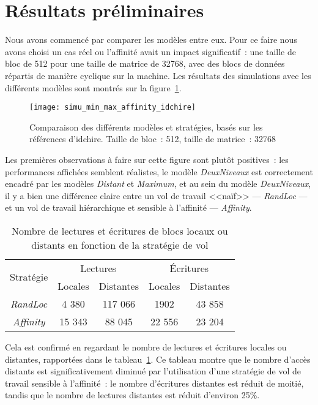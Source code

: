 \section{Résultats préliminaires}\label{sec:simulation:resultats}


Nous avons commencé par comparer les modèles entre eux.
Pour ce faire nous avons choisi un cas réel ou l'affinité avait un impact significatif~: une taille de bloc de 512 pour une taille de matrice de 32768, avec des blocs de données répartis de manière cyclique sur la machine.
Les résultats des simulations avec les différents modèles sont montrés sur la figure~\ref{fig:simu:modeles:idchire}.

\begin{figure}[h!]
  \centering
  \texttt{[image: simu\_min\_max\_affinity\_idchire]}
  \caption{Comparaison des différents modèles et stratégies, basés sur les références d'idchire. Taille de bloc~: 512, taille de matrice~: 32768}\label{fig:simu:modeles:idchire}
\end{figure}


Les premières observations à faire sur cette figure sont plutôt positives~: les performances affichées semblent réalistes, le modèle \emph{DeuxNiveaux} est correctement encadré par les modèles \emph{Distant} et \emph{Maximum}, et au sein du modèle \emph{DeuxNiveaux}, il y a bien une différence claire entre un vol de travail <<naïf>> --- \emph{RandLoc} --- et un vol de travail hiérarchique et sensible à l'affinité --- \emph{Affinity}.

\begin{table}[h!]
\def\arraystretch{1.5}
\centering
\begin{tabular}{|c||c|c|c|c|}\hline
  \multirow{2}{*}{Stratégie} & \multicolumn{2}{c|}{Lectures} & \multicolumn{2}{c|}{Écritures} \\ \cline{2-5}
    & Locales & Distantes & Locales & Distantes \\
  \hline
  \emph{RandLoc} & 4 380 & 117 066 & 1902 & 43 858 \\
  \hline
  \emph{Affinity} & 15 343 & 88 045 & 22 556 & 23 204 \\
  \hline
\end{tabular}
\caption{Nombre de lectures et écritures de blocs locaux ou distants en fonction de la stratégie de vol}\label{tab:simu:acces-blocs-idchire}
\end{table}

Cela est confirmé en regardant le nombre de lectures et écritures locales ou distantes, rapportées dans le tableau~\ref{tab:simu:acces-blocs-idchire}.
Ce tableau montre que le nombre d'accès distants est significativement diminué par l'utilisation d'une stratégie de vol de travail sensible à l'affinité~: le nombre d'écritures distantes est réduit de moitié, tandis que le nombre de lectures distantes est réduit d'environ 25\%.


